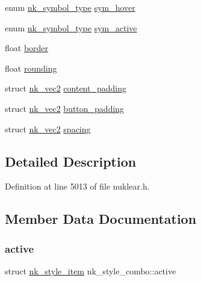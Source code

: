 \begin{DoxyCompactItemize}
\item 
enum \mbox{\hyperlink{nuklear_8h_a29b4aaa400d0ce28aea3c8c9c372ac07}{nk\+\_\+symbol\+\_\+type}} \mbox{\hyperlink{structnk__style__combo_a85a58381e0f7d045f84cd02378dd1b25}{sym\+\_\+hover}}
\item 
enum \mbox{\hyperlink{nuklear_8h_a29b4aaa400d0ce28aea3c8c9c372ac07}{nk\+\_\+symbol\+\_\+type}} \mbox{\hyperlink{structnk__style__combo_a6240902e9bfdef2587d8d9322fddf203}{sym\+\_\+active}}
\item 
float \mbox{\hyperlink{structnk__style__combo_a7590d9e1de6747e33b8a8b50e0e96ff4}{border}}
\item 
float \mbox{\hyperlink{structnk__style__combo_ac12f845441d878beaa895eb453e69c89}{rounding}}
\item 
struct \mbox{\hyperlink{structnk__vec2}{nk\+\_\+vec2}} \mbox{\hyperlink{structnk__style__combo_a30a280e81ec452d7cd28be4fbc2e4255}{content\+\_\+padding}}
\item 
struct \mbox{\hyperlink{structnk__vec2}{nk\+\_\+vec2}} \mbox{\hyperlink{structnk__style__combo_ad54d7c59d27c10d24000231699d32a33}{button\+\_\+padding}}
\item 
struct \mbox{\hyperlink{structnk__vec2}{nk\+\_\+vec2}} \mbox{\hyperlink{structnk__style__combo_a8d60722cdce4a4679d631feda0efa49c}{spacing}}
\end{DoxyCompactItemize}


\subsection{Detailed Description}


Definition at line 5013 of file nuklear.\+h.



\subsection{Member Data Documentation}
\mbox{\label{structnk__style__combo_aa8bd909d3b920864bf608d9358079d74}} 
\subsubsection{\texorpdfstring{active}{active}}
{\footnotesize\ttfamily struct \mbox{\hyperlink{structnk__style__item}{nk\+\_\+style\+\_\+item}} nk\+\_\+style\+\_\+combo\+::active}



